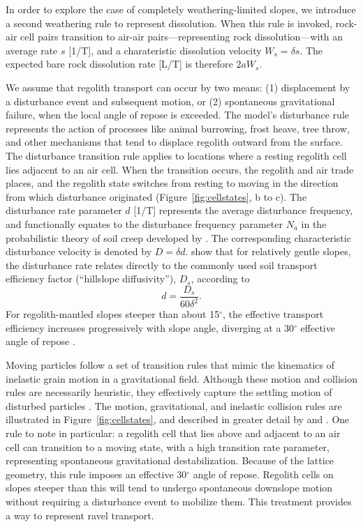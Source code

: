 In order to explore the case of completely weathering-limited slopes, we introduce a second weathering rule to represent dissolution. When this rule is invoked, rock-air cell pairs transition to air-air pairs---representing rock dissolution---with an average rate $s$ [1/T], and a charateristic dissolution velocity $W_s = \delta s$. The expected bare rock dissolution rate [L/T] is therefore $2 a W_s$.

We assume that regolith transport can occur by two means: (1) displacement by a disturbance event and subsequent motion, or (2) spontaneous gravitational failure, when the local angle of repose is exceeded. The model's disturbance rule represents the action of processes like animal burrowing, frost heave, tree throw, and other mechanisms that tend to displace regolith outward from the surface. The disturbance transition rule applies to locations where a resting regolith cell lies adjacent to an air cell. When the transition occurs, the regolith and air trade places, and the regolith state switches from resting to moving in the direction from which disturbance originated (Figure~\ref{fig:cellstates}, b to c). The disturbance rate parameter $d$ [1/T] represents the average disturbance frequency, and functionally equates to the disturbance frequency parameter $N_a$ in the probabilistic theory of soil creep developed by \citet{furbish2009statistical}. The corresponding characteristic disturbance velocity is denoted by $D=\delta d$.  \citet{tucker2018lattice} show that for relatively gentle slopes, the disturbance rate relates directly to the commonly used soil transport efficiency factor (``hillslope diffusivity''), $D_s$, according to
\begin{equation}
d = \frac{D_s}{60 \delta^2}.
\end{equation}
For regolith-mantled slopes steeper than about 15$^\circ$, the effective transport efficiency increases progressively with slope angle, diverging at a 30$^\circ$ effective angle of repose \citep[][their Figure 10]{tucker2018lattice}.

Moving particles follow a set of transition rules that mimic the kinematics of inelastic grain motion in a gravitational field. Although these motion and collision rules are necessarily heuristic, they effectively capture the settling motion of disturbed particles \citep{furbish2009statistical}. The motion, gravitational, and inelastic collision rules are illustrated in Figure~\ref{fig:cellstates}, and described in greater detail by \citet{tucker2016celllab} and \citet{tucker2018lattice}. One rule to note in particular: a regolith cell that lies above and adjacent to an air cell can transition to a moving state, with a high transition rate parameter, representing spontaneous gravitational destabilization. Because of the lattice geometry, this rule imposes an effective 30$^\circ$ angle of repose. Regolith cells on slopes steeper than this will tend to undergo spontaneous downslope motion without requiring a disturbance event to mobilize them. This treatment provides a way to represent ravel transport.

